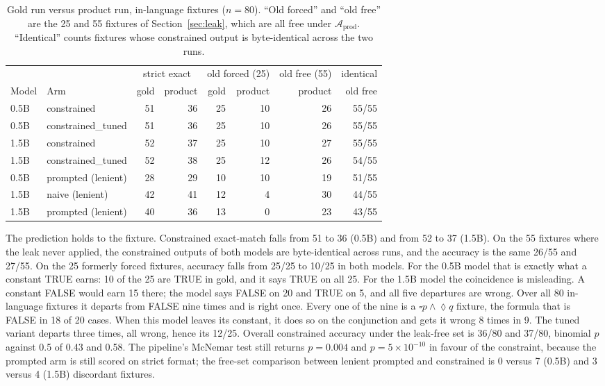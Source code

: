 \documentclass[11pt]{article}
\renewcommand{\Box}{\square}
\newcommand{\Dia}{\lozenge}
\begin{document}
\begin{table}[t]
\centering
\caption{Gold run versus product run, in-language fixtures ($n{=}80$). ``Old forced'' and ``old free'' are the 25 and 55 fixtures of Section~\ref{sec:leak}, which are all free under $\mathcal{A}_{\mathrm{prod}}$. ``Identical'' counts fixtures whose constrained output is byte-identical across the two runs.}
\label{tab:replication}
\small
\setlength{\tabcolsep}{4pt}
\begin{tabular}{llrrrrrr}
\toprule
 & & \multicolumn{2}{c}{strict exact} & \multicolumn{2}{c}{old forced (25)} & old free (55) & identical \\
\cmidrule(lr){3-4}\cmidrule(lr){5-6}
Model & Arm & gold & product & gold & product & product & old free \\
\midrule
0.5B & constrained & 51 & 36 & 25 & 10 & 26 & 55/55 \\
0.5B & constrained\_tuned & 51 & 36 & 25 & 10 & 26 & 55/55 \\
1.5B & constrained & 52 & 37 & 25 & 10 & 27 & 55/55 \\
1.5B & constrained\_tuned & 52 & 38 & 25 & 12 & 26 & 54/55 \\
\midrule
0.5B & prompted (lenient) & 28 & 29 & 10 & 10 & 19 & 51/55 \\
1.5B & naive (lenient) & 42 & 41 & 12 & 4 & 30 & 44/55 \\
1.5B & prompted (lenient) & 40 & 36 & 13 & 0 & 23 & 43/55 \\
\bottomrule
\end{tabular}
\end{table}

The prediction holds to the fixture. Constrained exact-match falls from 51 to 36 (0.5B) and from 52 to 37 (1.5B). On the 55 fixtures where the leak never applied, the constrained outputs of both models are byte-identical across runs, and the accuracy is the same 26/55 and 27/55. On the 25 formerly forced fixtures, accuracy falls from 25/25 to 10/25 in both models. For the 0.5B model that is exactly what a constant TRUE earns: 10 of the 25 are TRUE in gold, and it says TRUE on all 25. For the 1.5B model the coincidence is misleading. A constant FALSE would earn 15 there; the model says FALSE on 20 and TRUE on 5, and all five departures are wrong. Over all 80 in-language fixtures it departs from FALSE nine times and is right once. Every one of the nine is a $\Box p\wedge\Dia q$ fixture, the formula that is FALSE in 18 of 20 cases. When this model leaves its constant, it does so on the conjunction and gets it wrong 8 times in 9. The tuned variant departs three times, all wrong, hence its 12/25. Overall constrained accuracy under the leak-free set is 36/80 and 37/80, binomial $p$ against 0.5 of 0.43 and 0.58. The pipeline's McNemar test still returns $p=0.004$ and $p=5\times10^{-10}$ in favour of the constraint, because the prompted arm is still scored on strict format; the free-set comparison between lenient prompted and constrained is 0 versus 7 (0.5B) and 3 versus 4 (1.5B) discordant fixtures.
\end{document}
